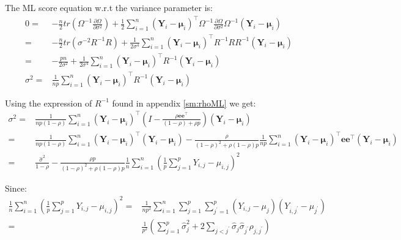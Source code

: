 \documentclass[12pt]{article}
\newcommand\Ve{\mathbf{e}}
\newcommand\VY{\mathbf{Y}}
\newcommand\Vmu{\boldsymbol{\mu}}
\newcommand\trans[1]{{#1}^\intercal}%
\begin{document}
The ML score equation w.r.t the variance parameter is:
\begin{align*}
0=&-\frac{n}{2} tr\left(\Omega^{-1} \frac{\partial \Omega}{\partial\sigma^2}\right) + \frac{1}{2} \sum_{i=1}^n \trans{(\VY_i-\Vmu_i)} \Omega^{-1} \frac{\partial \Omega}{\partial \sigma^2} \Omega^{-1} (\VY_i-\Vmu_i) \\
 =&-\frac{n}{2} tr\left(\sigma^{-2} R^{-1} R \right) + \frac{1}{2 \sigma^4} \sum_{i=1}^n \trans{(\VY_i-\Vmu_i)} R^{-1} R R^{-1} (\VY_i-\Vmu_i) \\
 =&-\frac{pn}{2 \sigma^2} + \frac{1}{2 \sigma^4} \sum_{i=1}^n \trans{(\VY_i-\Vmu_i)} R^{-1} (\VY_i-\Vmu_i) \\ 
\sigma^2 =& \frac{1}{n p} \sum_{i=1}^n \trans{(\VY_i-\Vmu_i)} R^{-1} (\VY_i-\Vmu_i) 
\end{align*}

Using the expression of \(R^{-1}\) found in appendix \ref{sm:rhoML} we get:
\begin{align*}
\sigma^2 =& \frac{1}{n p (1- \rho)} \sum_{i=1}^n \trans{(\VY_i-\Vmu_i)} \left(I - \frac{\rho \Ve\trans{\Ve}}{(1-\rho)+\rho p} \right) (\VY_i-\Vmu_i)  \\
 =& \frac{1}{n p (1- \rho)} \sum_{i=1}^n \trans{(\VY_i-\Vmu_i)}(\VY_i-\Vmu_i)  - \frac{\rho}{(1-\rho)^2+\rho(1-\rho) p} \frac{1}{np} \sum_{i=1}^n \trans{(\VY_i-\Vmu_i)} \Ve\trans{\Ve} (\VY_i-\Vmu_i)  \\
 =& \frac{\widehat{\sigma}^2}{1- \rho}  - \frac{\rho p}{(1-\rho)^2+\rho(1-\rho) p} \frac{1}{n} \sum_{i=1}^n \left(\frac{1}{p}\sum_{j=1}^p Y_{i,j}-\mu_{i,j}\right)^2
\end{align*}

Since:
\begin{align*}
\frac{1}{n} \sum_{i=1}^n \left(\frac{1}{p}\sum_{j=1}^p Y_{i,j}-\mu_{i,j}\right)^2=& \frac{1}{np^2} \sum_{i=1}^n \sum_{j=1}^p \sum_{j^{\prime}=1}^p \left(Y_{i,j}-\mu_j\right)\left(Y_{i,j^{\prime}}-\mu_{j^{\prime}}\right) \\
=&  \frac{1}{p^2} \left(\sum_{j=1}^p \widehat{\sigma}^2_j + 2\sum_{j < j^{\prime}}\widehat{\sigma}_j \widehat{\sigma}_{j^{\prime}}\widehat{\rho}_{j,j^{\prime}}\right) 
\end{align*}
\end{document}
